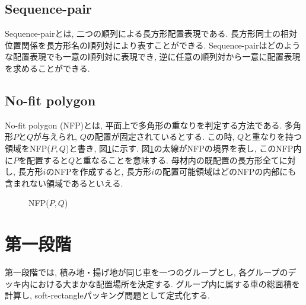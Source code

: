 \subsection{Sequence-pair}
Sequence-pairとは, 二つの順列による長方形配置表現である\cite{seq-pair}. 
長方形同士の相対位置関係を長方形名の順列対により表すことができる. 
Sequence-pairはどのような配置表現でも一意の順列対に表現でき, 逆に任意の順列対から一意に配置表現を求めることができる. 


\subsection{No-fit polygon}
No-fit polygon (NFP)とは, 平面上で多角形の重なりを判定する方法である\cite{nfp}\cite{nfp2}. 
多角形$P$と$Q$が与えられ, $Q$の配置が固定されているとする. 
この時, $Q$と重なりを持つ領域をNFP($P,Q$)と書き, 図\ref{figure31}に示す. 
図\ref{figure31}の太線がNFPの境界を表し, このNFP内に$P$を配置すると$Q$と重なることを意味する. 
母材内の既配置の長方形全てに対し, 長方形$i$のNFPを作成すると, 長方形$i$の配置可能領域はどのNFPの内部にも含まれない領域であるといえる. 

\begin{figure}
    \label{figure31}
    \caption{NFP($P,Q$)}
\end{figure}

\section{第一段階}
第一段階では, 積み地・揚げ地が同じ車を一つのグループとし, 各グループのデッキ内における大まかな配置場所を決定する. 
グループ内に属する車の総面積を計算し, soft-rectangleパッキング問題として定式化する. 

